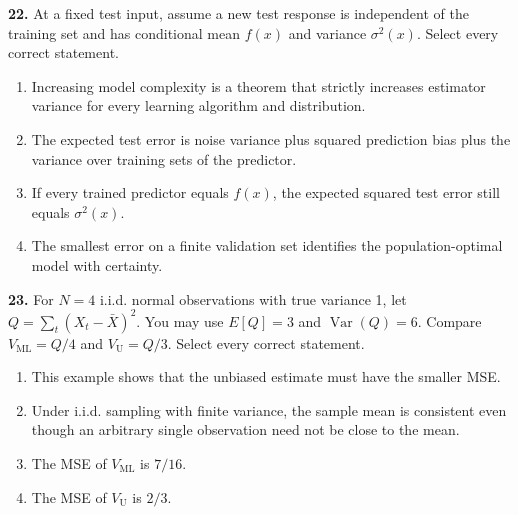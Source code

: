 \documentclass[11pt,a4paper]{article}
\begin{document}
\par\noindent\begin{minipage}{\linewidth}
\textbf{22.} At a fixed test input, assume a new test response is independent of the training set and has conditional mean \(f(x)\) and variance \(\sigma^2(x)\). Select every correct statement.
\begin{enumerate}[label=(\Alph*),leftmargin=8mm,itemsep=2pt,topsep=2pt]
\item Increasing model complexity is a theorem that strictly increases estimator variance for every learning algorithm and distribution.
\item The expected test error is noise variance plus squared prediction bias plus the variance over training sets of the predictor.
\item If every trained predictor equals \(f(x)\), the expected squared test error still equals \(\sigma^2(x)\).
\item The smallest error on a finite validation set identifies the population-optimal model with certainty.
\end{enumerate}

\end{minipage}\par\vspace{3mm}
\par\noindent\begin{minipage}{\linewidth}
\textbf{23.} For \(N=4\) i.i.d. normal observations with true variance 1, let \(Q=\sum_t(X_t-\bar X)^2\). You may use \(E[Q]=3\) and \(\operatorname{Var}(Q)=6\). Compare \(V_{\mathrm{ML}}=Q/4\) and \(V_{\mathrm U}=Q/3\). Select every correct statement.
\begin{enumerate}[label=(\Alph*),leftmargin=8mm,itemsep=2pt,topsep=2pt]
\item This example shows that the unbiased estimate must have the smaller MSE.
\item Under i.i.d. sampling with finite variance, the sample mean is consistent even though an arbitrary single observation need not be close to the mean.
\item The MSE of \(V_{\mathrm{ML}}\) is \(7/16\).
\item The MSE of \(V_{\mathrm U}\) is \(2/3\).
\end{enumerate}

\end{minipage}\par\vspace{3mm}
\end{document}
